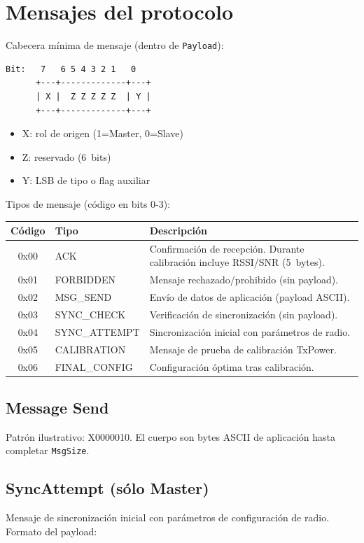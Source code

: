 \documentclass[11pt,a4paper]{article}
\begin{document}
\section{Mensajes del protocolo}
Cabecera mínima de mensaje (dentro de \texttt{Payload}):
\begin{verbatim}
Bit:   7   6 5 4 3 2 1   0
      +---+-------------+---+
      | X |  Z Z Z Z Z  | Y |
      +---+-------------+---+
\end{verbatim}
\begin{itemize}
  \item X: rol de origen (1=Master, 0=Slave)
  \item Z: reservado (6~bits)
  \item Y: LSB de tipo o flag auxiliar
\end{itemize}
\noindent Tipos de mensaje (código en bits 0-3):
\begin{center}
\begin{tabular}{|c|l|p{7.5cm}|}
\hline
\textbf{Código} & \textbf{Tipo} & \textbf{Descripción} \\
\hline
  0x00 & ACK & Confirmación de recepción. Durante calibración incluye RSSI/SNR (5~bytes). \\
  0x01 & FORBIDDEN & Mensaje rechazado/prohibido (sin payload). \\
  0x02 & MSG\_SEND & Envío de datos de aplicación (payload ASCII). \\
  0x03 & SYNC\_CHECK & Verificación de sincronización (sin payload). \\
  0x04 & SYNC\_ATTEMPT & Sincronización inicial con parámetros de radio. \\
  0x05 & CALIBRATION & Mensaje de prueba de calibración TxPower. \\
  0x06 & FINAL\_CONFIG & Configuración óptima tras calibración. \\
\hline
\end{tabular}
\end{center}

\subsection{Message Send}
Patrón ilustrativo: X0000010. El cuerpo son bytes ASCII de aplicación hasta completar \texttt{MsgSize}.

\subsection{SyncAttempt (sólo Master)}
Mensaje de sincronización inicial con parámetros de configuración de radio. Formato del payload:
\end{document}
